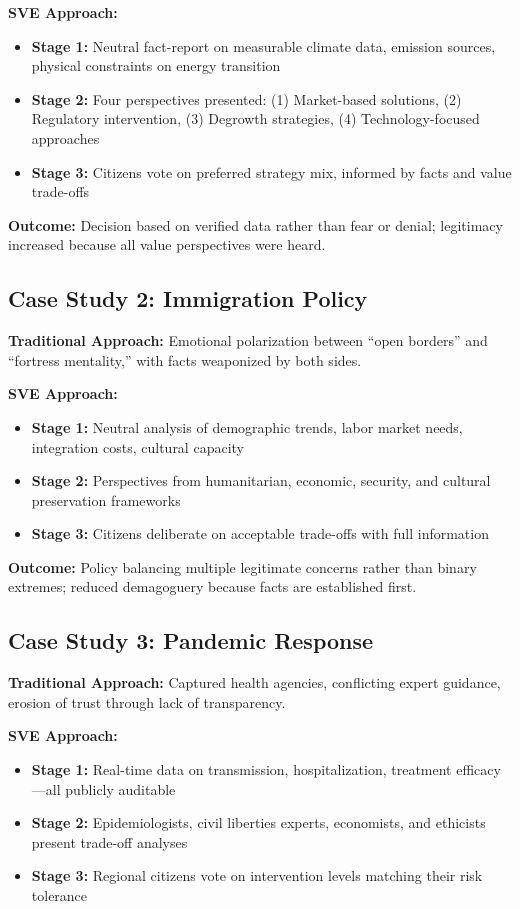 \documentclass[11pt,a4paper]{article}
\begin{document}
\textbf{SVE Approach:}
\begin{itemize}[nosep]
    \item \textbf{Stage 1:} Neutral fact-report on measurable climate data, emission sources, physical constraints on energy transition
    \item \textbf{Stage 2:} Four perspectives presented: (1) Market-based solutions, (2) Regulatory intervention, (3) Degrowth strategies, (4) Technology-focused approaches
    \item \textbf{Stage 3:} Citizens vote on preferred strategy mix, informed by facts and value trade-offs
\end{itemize}

\textbf{Outcome:} Decision based on verified data rather than fear or denial; legitimacy increased because all value perspectives were heard.

\subsection*{Case Study 2: Immigration Policy}

\textbf{Traditional Approach:} Emotional polarization between ``open borders'' and ``fortress mentality,'' with facts weaponized by both sides.

\textbf{SVE Approach:}
\begin{itemize}[nosep]
    \item \textbf{Stage 1:} Neutral analysis of demographic trends, labor market needs, integration costs, cultural capacity
    \item \textbf{Stage 2:} Perspectives from humanitarian, economic, security, and cultural preservation frameworks
    \item \textbf{Stage 3:} Citizens deliberate on acceptable trade-offs with full information
\end{itemize}

\textbf{Outcome:} Policy balancing multiple legitimate concerns rather than binary extremes; reduced demagoguery because facts are established first.

\subsection*{Case Study 3: Pandemic Response}

\textbf{Traditional Approach:} Captured health agencies, conflicting expert guidance, erosion of trust through lack of transparency.

\textbf{SVE Approach:}
\begin{itemize}[nosep]
    \item \textbf{Stage 1:} Real-time data on transmission, hospitalization, treatment efficacy—all publicly auditable
    \item \textbf{Stage 2:} Epidemiologists, civil liberties experts, economists, and ethicists present trade-off analyses
    \item \textbf{Stage 3:} Regional citizens vote on intervention levels matching their risk tolerance
\end{itemize}
\end{document}
